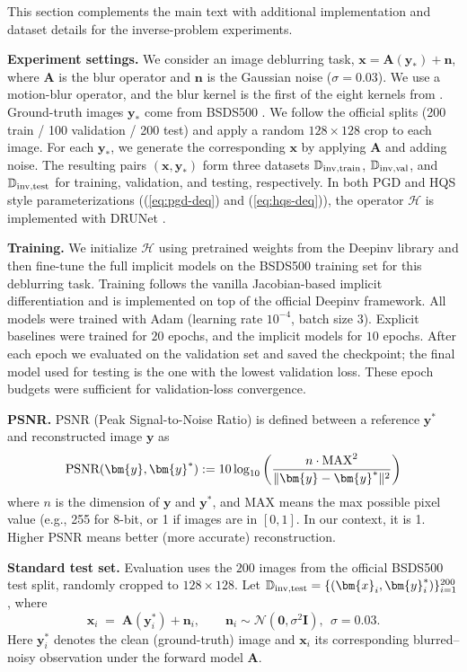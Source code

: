 \documentclass{amsart} %
\def\eqref#1{equation~\ref{#1}}
\def\vzero{{\bm{0}}}
\def\vn{{\bm{n}}}
\def\vx{{\bm{x}}}
\def\vy{{\bm{y}}}
\def\mA{{\bm{A}}}
\def\mI{{\bm{I}}}
\def\sD{{\mathbb{D}}}
\def\cH{{\mathcal{H}}}
\def\cN{{\mathcal{N}}}
\theoremstyle{definition}
\theoremstyle{remark}
\renewcommand{\eqref}[1]{\textup{(\ref{#1})}}
\begin{document}
This section complements the main text with additional implementation and dataset details for the inverse-problem experiments.

\textbf{Experiment settings.} We consider an image deblurring task, $\vx = \mA(\vy_\ast) + \vn$, where $\mA$ is the blur operator and $\vn$ is the Gaussian noise ($\sigma=0.03$). We use a motion-blur operator, and the blur kernel is the first of the eight kernels from \cite{Levin_2009_CVPR}. Ground-truth images $\vy_\ast$ come from BSDS500 \cite{MartinFTM01}. We follow the official splits (200 train / 100 validation / 200 test) and apply a random $128 \times 128$ crop to each image. For each $\vy_\ast$, we generate the corresponding $\vx$ by applying $\mA$ and adding noise. The resulting pairs $(\vx,\vy_\ast)$ form three datasets $\sD_{\textup{inv,train}}$, $\sD_{\textup{inv,val}}$, and $\sD_{\textup{inv,test}}$ for training, validation, and testing, respectively.
In both PGD and HQS style parameterizations (\eqref{eq:pgd-deq} and \eqref{eq:hqs-deq}), the operator $\cH$ is implemented with DRUNet \cite{zhang2021plug}. 



\textbf{Training.} We initialize $\cH$ using pretrained weights from the Deepinv library \cite{tachella2025deepinverse} and then fine-tune the full implicit models on the BSDS500 training set for this deblurring task. Training follows the vanilla Jacobian-based implicit differentiation and is implemented on top of the official Deepinv framework.
All models were trained with Adam (learning rate \(10^{-4}\), batch size \(3\)).
Explicit baselines were trained for \(20\) epochs, and the implicit models for \(10\) epochs.
After each epoch we evaluated on the validation set and saved the checkpoint; the final model used for testing is the one with the lowest validation loss. These epoch budgets were sufficient for validation-loss convergence.

\textbf{PSNR.} PSNR (Peak Signal-to-Noise Ratio) is defined between a reference $\vy^\ast$ and reconstructed image $\vy$ as
\[\textup{PSNR}(\vy,\vy^\ast):= 10 \log_{10}\left(\frac{n \cdot \textup{MAX}^2}{\|\vy-\vy^\ast\|^2}\right)\]
where $n$ is the dimension of $\vy$ and $\vy^\ast$, and MAX means the max possible pixel value (e.g., 255 for 8-bit, or 1 if images are in $[0,1]$. In our context, it is 1. Higher PSNR means better (more accurate) reconstruction.

\textbf{Standard test set.}
Evaluation uses the \(200\) images from the official BSDS500 test split, randomly cropped to \(128\times128\).
Let \(\sD_{\textup{inv,test}}=\{(\vx_i,\vy_i^\ast)\}_{i=1}^{200}\), where
\[
\vx_i \;=\; \mA(\vy_i^\ast) + \vn_i,\qquad \vn_i \sim \cN(\vzero,\sigma^2 \mI),\ \ \sigma=0.03.
\]
Here \(\vy_i^\ast\) denotes the clean (ground-truth) image and \(\vx_i\) its corresponding blurred–noisy observation under the forward model \(\mA\).
\end{document}
